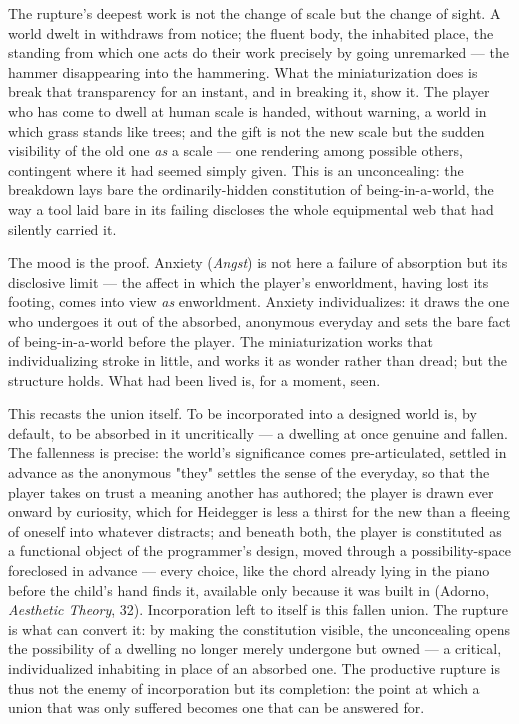\documentclass{article}
\begin{document}
The rupture's deepest work is not the change of scale but the change of sight. A world dwelt in withdraws from notice; the fluent body, the inhabited place, the standing from which one acts do their work precisely by going unremarked — the hammer disappearing into the hammering. What the miniaturization does is break that transparency for an instant, and in breaking it, show it. The player who has come to dwell at human scale is handed, without warning, a world in which grass stands like trees; and the gift is not the new scale but the sudden visibility of the old one \textit{as} a scale — one rendering among possible others, contingent where it had seemed simply given. This is an unconcealing: the breakdown lays bare the ordinarily-hidden constitution of being-in-a-world, the way a tool laid bare in its failing discloses the whole equipmental web that had silently carried it.

The mood is the proof. Anxiety (\textit{Angst}) is not here a failure of absorption but its disclosive limit — the affect in which the player's enworldment, having lost its footing, comes into view \textit{as} enworldment. Anxiety individualizes: it draws the one who undergoes it out of the absorbed, anonymous everyday and sets the bare fact of being-in-a-world before the player. The miniaturization works that individualizing stroke in little, and works it as wonder rather than dread; but the structure holds. What had been lived is, for a moment, seen.

This recasts the union itself. To be incorporated into a designed world is, by default, to be absorbed in it uncritically — a dwelling at once genuine and fallen. The fallenness is precise: the world's significance comes pre-articulated, settled in advance as the anonymous "they" settles the sense of the everyday, so that the player takes on trust a meaning another has authored; the player is drawn ever onward by curiosity, which for Heidegger is less a thirst for the new than a fleeing of oneself into whatever distracts; and beneath both, the player is constituted as a functional object of the programmer's design, moved through a possibility-space foreclosed in advance — every choice, like the chord already lying in the piano before the child's hand finds it, available only because it was built in (Adorno, \textit{Aesthetic Theory}, 32). Incorporation left to itself is this fallen union. The rupture is what can convert it: by making the constitution visible, the unconcealing opens the possibility of a dwelling no longer merely undergone but owned — a critical, individualized inhabiting in place of an absorbed one. The productive rupture is thus not the enemy of incorporation but its completion: the point at which a union that was only suffered becomes one that can be answered for.
\end{document}
